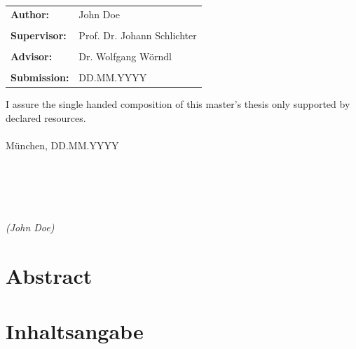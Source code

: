 \documentclass[12pt,oneside, draft]{report}
\begin{document}
\begin{tabular}{ll}
{\Large \bf Author:} & {\Large John Doe} \\\\
{\Large \bf Supervisor:} & {\Large Prof. Dr. Johann Schlichter} \\\\
{\Large \bf Advisor:} & {\Large Dr. Wolfgang Wörndl} \\\\
{\Large \bf Submission:} & {\Large DD.MM.YYYY}
\end{tabular}

\newpage	
\thispagestyle{empty}
\hoffset=0mm
\vspace*{\fill}
\noindent I assure the single handed composition of this master's thesis only supported by declared resources.\\\\
München, DD.MM.YYYY\\\\\\\\\\\\
\noindent \textit{(John Doe)}

\newpage
\thispagestyle{empty}
\null

\newpage
\thispagestyle{empty}
\hoffset=0mm
\section*{Abstract}	
\begin{spacing}{1.2}

\end{spacing}
	
\section*{Inhaltsangabe}
\begin{spacing}{1.2}

\end{spacing}

\newpage
\setcounter{page}{1}
\hoffset=0mm
\setcounter{tocdepth}{3}
\setcounter{secnumdepth}{3}
\fboxsep 0mm


\newpage
\end{document}
